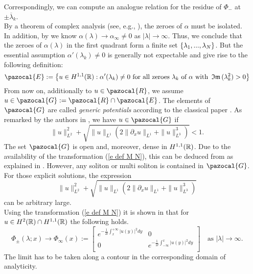 Correspondingly, we can compute an analogue relation for the residue of $\Phi_-$ at $\pm\overline{\lambda}_k$.\\
By a theorem of complex analysis (see, e.g., \cite[Theorem 3.2.8]{Ablowitz2003}), the zeroes of $\alpha$ must be isolated. In addition, by \cite[Lemma 4]{Pelinovsky2016} we know $\alpha(\lambda)\to\alpha_{\infty}\neq 0$ as $|\lambda|\to\infty$. Thus, we conclude that the zeroes of $\alpha(\lambda)$ in the first quadrant form a finite set $\left\{\lambda_1,...,\lambda_N\right\}$. But the essential assumption $\alpha'(\lambda_k)\neq 0$ is generally not expectable and give rise to the following definition:
\begin{equation}\label{e def no eigenvalues}
    \pazocal{E}:=\set{u\in H^{1,1}(\Real):\alpha'(\lambda_k)\neq 0\text{ for all zeroes }\lambda_k\text{ of }\alpha\text{ with } \im(\lambda_k^2)>0}
\end{equation}
From now on, additionally to $u\in\pazocal{R}$,  we assume $u\in\pazocal{G}:=\pazocal{R}\cap\pazocal{E}$. The elements of $\pazocal{G}$ are called \emph{generic potentials} according to the classical paper \cite{Beals1984}. As remarked by the authors in \cite[Remark 5]{Pelinovsky2016}, we have $u\in\pazocal{G}$ if
\begin{equation*}\label{e estimate for no eigenv and reso}
    \|u\|_{L^2}^2+\sqrt{\|u\|_{L^1}( 2\|\partial_x u\|_{L^1}+\|u\|_{L^3}^3)}<1.
\end{equation*}
The set $\pazocal{G}$ is open and, moreover, dense in $H^{1,1}(\mathbb R)$. Due to the availability of the transformation (\ref{e def M N}), this can be deduced from \cite{Beals1984} as explained in \cite[Proposition 4]{PelinShimaSaal2017}. However, any soliton or multi soliton is contained in $\pazocal{G}$. For those explicit solutions, the expression
\begin{equation*}
    \|u\|_{L^2}^2+\sqrt{\|u\|_{L^1}( 2\|\partial_x u\|_{L^1}+\|u\|_{L^3}^3)}
\end{equation*}
can be arbitrary large.
\medskip\\
Using the transformation (\ref{e def M N}) it is shown in \cite{Pelinovsky2016} that for $u\in H^2(\mathbb R)\cap H^{1,1}(\mathbb R)$ the following holds.
\begin{equation}\label{e def Phi infty}
    \Phi_{\pm}(\lambda;x)\to\Phi_{\infty}(x):=
    \left[
      \begin{array}{cc}
        e^{-\frac{1}{2\ii}\int^{+\infty}_x|u(y)|^2dy} & 0 \\
        0 & e^{-\frac{1}{2\ii}\int_{-\infty}^x|u(y)|^2dy} \\
      \end{array}
    \right]\quad\text{as }|\lambda|\to\infty.
\end{equation}
The limit has to be taken along a contour  in the corresponding domain of analyticity.


